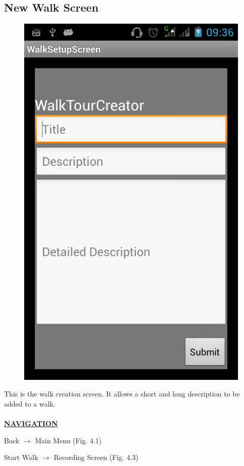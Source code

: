 \documentclass[12pt]{article}
\begin{document}
\subsection{New Walk Screen}
\begin{figure}[htp]
\centering
\includegraphics[scale=0.40]{Project_Plan/android/new_walk.png}
\caption{}
\label{}
\end{figure}
\par{This is the walk creation screen. It allows a short and long description to be added to a walk.  \\ \\}
\textbf{\uline{NAVIGATION}}
\par{Back $\rightarrow$ Main Menu (Fig. 4.1)}
\par{Start Walk $\rightarrow$ Recording Screen (Fig. 4.3)}
\clearpage
\end{document}
